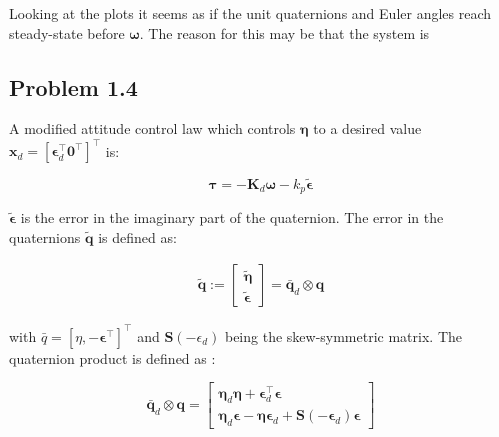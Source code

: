 
Looking at the plots it seems as if the unit quaternions and Euler angles reach steady-state before $\boldsymbol{\omega}$. The reason for this may be that the system is 


\subsection*{Problem 1.4}
A modified attitude control law which controls $\boldsymbol{\eta}$ to a desired value $\mathbf{x}_d = [\boldsymbol{\epsilon}_d^\top \boldsymbol{0}^\top]^\top$ is:

\begin{equation}
    \boldsymbol{\tau} = - \mathbf{K}_d \boldsymbol{\omega} - k_p \tilde{\boldsymbol{\epsilon}}
    \label{eq:control_law_attitude2}
\end{equation}

$\tilde{\boldsymbol{\epsilon}}$ is the error in the imaginary part of the quaternion. The error in the quaternions $\tilde{\mathbf{q}}$ is defined as:

\begin{equation}
    \begin{aligned}
    \tilde{\boldsymbol{q}}
    :=
    \begin{bmatrix}
    \tilde{\boldsymbol{\eta}} \\
    \tilde{\boldsymbol{\epsilon}}
    \end{bmatrix}
    =
    \bar{\boldsymbol{q}}_d \otimes \boldsymbol{q}
    \label{eq:q_tilde}
    \end{aligned}
\end{equation}

with $\bar{q} = [\eta, -\boldsymbol{\epsilon}^\top] ^\top$ and $\mathbf{S}(-\epsilon_d)$ being the skew-symmetric matrix. The quaternion product is defined as :

\begin{equation}
    \bar{\boldsymbol{q}}_d \otimes \boldsymbol{q}
    =
    \begin{bmatrix}
    \boldsymbol{\eta}_{d} \boldsymbol{\eta} + \boldsymbol{\epsilon}_d^\top \boldsymbol{\epsilon} \\
    \boldsymbol{\eta}_d \boldsymbol{\epsilon} - \boldsymbol{\eta} \boldsymbol{\epsilon}_d + \mathbf{S}(-\boldsymbol{\epsilon}_d) \boldsymbol{\epsilon}
    \end{bmatrix}
    \label{eq:q_product}
\end{equation}

